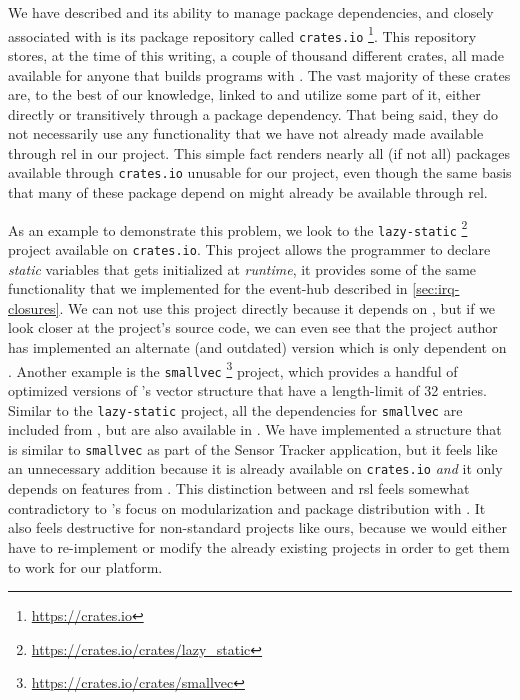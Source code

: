 We have described {\cargo} and its ability to manage package dependencies, and closely associated with {\cargo} is its package repository called \texttt{crates.io} \footnote{\url{https://crates.io}}.
This repository stores, at the time of this writing, a couple of thousand different {\rust} crates, all made available for anyone that builds {\rust} programs with {\cargo}.
The vast majority of these crates are, to the best of our knowledge, linked to {\std} and utilize some part of it, either directly or transitively through a package dependency.
That being said, they do not necessarily use any functionality that we have not already made available through \gls{rel} in our project.
This simple fact renders nearly all (if not all) packages available through \texttt{crates.io} unusable for our project, even though the same basis that many of these package depend on might already be available through \gls{rel}.

As an example to demonstrate this problem, we look to the \texttt{lazy-static} \footnote{\url{https://crates.io/crates/lazy_static}} project available on \texttt{crates.io}.
This project allows the programmer to declare \emph{static} variables that gets initialized at \emph{runtime}, it provides some of the same functionality that we implemented for the event-hub described in \autoref{sec:irq-closures}.
We can not use this project directly because it depends on {\std}, but if we look closer at the project's source code, we can even see that the project author has implemented an alternate (and outdated) version which is only dependent on {\core}.
Another example is the \texttt{smallvec} \footnote{\url{https://crates.io/crates/smallvec}} project, which provides a handful of optimized versions of {\rust}'s vector structure that have a length-limit of 32 entries.
Similar to the \texttt{lazy-static} project, all the dependencies for \texttt{smallvec} are included from {\std}, but are also available in {\core}.
We have implemented a structure that is similar to \texttt{smallvec} as part of the Sensor Tracker application, but it feels like an unnecessary addition because it is already available on \texttt{crates.io} \emph{and} it only depends on features from {\core}.
This distinction between {\std} and \gls{rsl} feels somewhat contradictory to {\rust}'s focus on modularization and package distribution with {\cargo}.
It also feels destructive for non-standard projects like ours, because we would either have to re-implement or modify the already existing projects in order to get them to work for our platform.